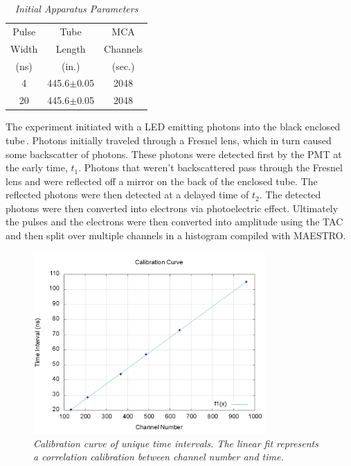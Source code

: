\documentclass[aps,prl,twocolumn,superscriptaddress]{revtex4-1}
\begin{document}
\begin{table}[htb!] 
\caption{\it Initial Apparatus Parameters}
\label{t1}   %
 \begin{center}   %
    \begin{tabular}{|c|c|c|} \hline   %

Pulse & Tube & MCA \\
Width & Length & Channels  \\
(ns)  & (in.) & (sec.)   \\ \hline \hline
4 & 445.6$\pm$0.05 & 2048 \\ \hline
20 & 445.6$\pm$0.05  &  2048  \\ \hline

     \end{tabular}
  \end{center}
\end{table}


The experiment initiated with a LED emitting photons into the black enclosed tube\,\cite{3}. Photons initially traveled through a Fresnel lens, which in turn caused some backscatter of photons. These photons were detected first by the PMT at the early time, $t_1$. Photons that weren't backscattered pass through the Fresnel lens and were reflected off a mirror on the back of the enclosed tube. The reflected photons were then detected at a delayed time of $t_2$. The detected photons were then converted into electrons via photoelectric effect. Ultimately the pulses and the electrons were then converted into amplitude using the TAC and then split over multiple channels in a histogram compiled with MAESTRO.

\begin{figure}[h!]
  \begin{center}
\centerline{\includegraphics[width=3.5in]{calib.png}}
\caption{\it \small{Calibration curve of unique time intervals. The linear fit represents a correlation calibration between channel number and time. \label{fig1}}}
  \end{center}
\end{figure}
\end{document}
